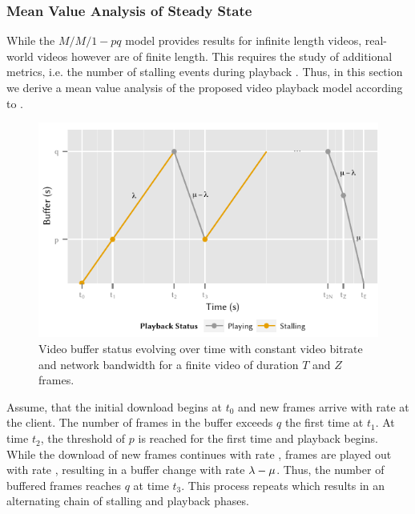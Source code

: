 \subsubsection*{Mean Value Analysis of Steady State}\label{sec:application:qoe_user_behaviour:system_model:steady_state}
While the \(M/M/1-pq\) model provides results for infinite length videos, real-world videos however are of finite length.
This requires the study of additional metrics, i.e. the number of stalling events during playback \numberStallingEvents.
Thus, in this section we derive a mean value analysis of the proposed video playback model according to .

\begin{figure}
  \centering
  \includegraphics{application/qoe_user_behaviour/system_model/figures/player}
  \caption{Video buffer status evolving over time with constant video bitrate and network bandwidth for a finite video of duration \(T\) and \(Z\) frames.}
  \label{fig:application:qoe_user_behaviour:system_model:steady_state:player}
\end{figure}

Assume, that the initial download begins at \(t_0\) and new frames arrive with rate \networkBandwidth at the client.
The number of frames in the buffer exceeds \(q\) the first time at \(t_1\).
At time \(t_2\), the threshold of \(p\) is reached for the first time and playback begins.
While the download of new frames continues with rate \networkBandwidth, frames are played out with rate \playbackRate, resulting in a buffer change with rate \(\lambda - \mu\).
Thus, the number of buffered frames reaches \(q\) at time \(t_3\).
This process repeats which results in an alternating chain of stalling and playback phases.

